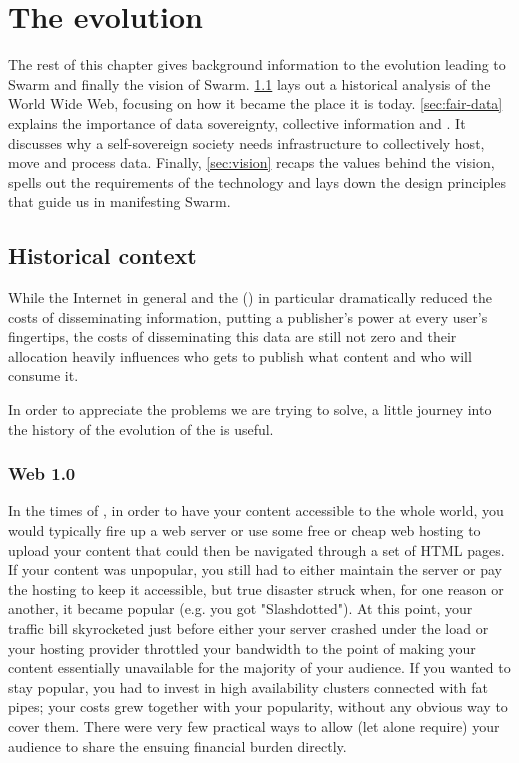 \chapter{The evolution  \statusgreen}\label{chap:vision}



The rest of this chapter gives background information to the evolution leading to Swarm and finally the vision of Swarm. \ref{sec:historical_context} lays out a historical analysis of the World Wide Web, focusing on how it became the place it is today.
\ref{sec:fair-data} explains the importance of data sovereignty, collective information and . It discusses why a self-sovereign society needs infrastructure to collectively host, move and process data.
Finally, \ref{sec:vision} recaps the values behind the vision, spells out the requirements of the technology and lays down the design principles that guide us in manifesting Swarm.

\section{Historical context  \statusgreen}\label{sec:historical_context}
\green{}
While the Internet in general and the  () in particular dramatically reduced the costs of disseminating information, putting a publisher's power at every user's fingertips, the costs of disseminating this data are still not zero and their allocation heavily influences who gets to publish what content and who will consume it.

In order to appreciate the problems we are trying to solve, a little journey into the history of the evolution of the  is useful.

\subsection{Web 1.0 \statusgreen}\label{sec:web_1}

In the times of , in order to have your content accessible to the whole world, you would typically fire up a web server or use some free or cheap web hosting to upload your content that could then be navigated through a set of HTML pages. If your content was unpopular, you still had to either maintain the server or pay the hosting to keep it accessible, but true disaster struck when, for one reason or another, it became popular (e.g. you got "Slashdotted"). At this point, your traffic bill skyrocketed just before either your server crashed under the load or your hosting provider throttled your bandwidth to the point of making your content essentially unavailable for the majority of your audience. If you wanted to stay popular, you had to invest in high availability clusters connected with fat pipes; your costs grew together with your popularity, without any obvious way to cover them. There were very few practical ways to allow (let alone require) your audience to share the ensuing financial burden directly.

